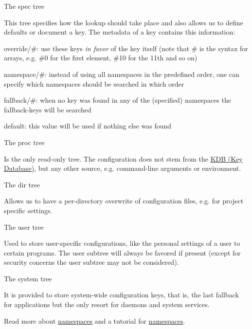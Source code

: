 \begin{DoxyItemize}
\item The {\ttfamily spec} tree

This tree specifies how the lookup should take place and also allows us to define defaults or document a key. The metadata of a key contains this information\+:
\begin{DoxyItemize}
\item {\ttfamily override/\#}\+: use these keys {\itshape in favor} of the key itself (note that {\ttfamily \#} is the syntax for arrays, e.\+g. {\ttfamily \#0} for the first element, {\ttfamily \#10} for the 11th and so on)
\item {\ttfamily namespace/\#}\+: instead of using all namespaces in the predefined order, one can specify which namespaces should be searched in which order
\item {\ttfamily fallback/\#}\+: when no key was found in any of the (specified) namespaces the {\ttfamily fallback}-\/keys will be searched
\item {\ttfamily default}\+: this value will be used if nothing else was found
\end{DoxyItemize}
\item The {\ttfamily proc} tree

Is the only read-\/only tree. The configuration does not stem from the \hyperlink{group__kdb}{K\+DB (Key Database)}, but any other source, e.\+g. command-\/line arguments or environment.
\item The {\ttfamily dir} tree

Allows us to have a per-\/directory overwrite of configuration files, e.\+g. for project specific settings.
\item The {\ttfamily user} tree

Used to store user-\/specific configurations, like the personal settings of a user to certain programs. The user subtree will always be favored if present (except for security concerns the user subtree may not be considered).
\item The {\ttfamily system} tree

It is provided to store system-\/wide configuration keys, that is, the last fallback for applications but the only resort for daemons and system services.
\end{DoxyItemize}

Read more about \hyperlink{doc_help_elektra-namespaces_md}{namespaces} and a tutorial for \hyperlink{doc_tutorials_namespaces_md}{namespaces}.

